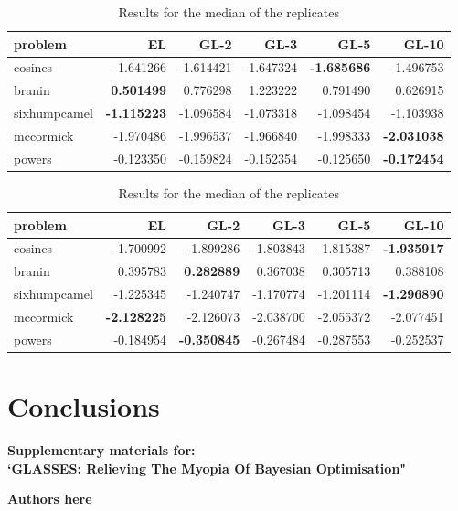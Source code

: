 \documentclass[twoside]{article}
\begin{document}
\begin{table*}
\begin{tabular}{lrrrrr}
\toprule
      problem &        EL &      GL-2 &      GL-3 &      GL-5 &     GL-10 \\
\midrule
      cosines & -1.641266 & -1.614421 & -1.647324 & \textbf{-1.685686} & -1.496753 \\
       branin &  \textbf{0.501499} &  0.776298 &  1.223222 &  0.791490 &  0.626915 \\
 sixhumpcamel & \textbf{-1.115223} & -1.096584 & -1.073318 & -1.098454 & -1.103938 \\
    mccormick & -1.970486 & -1.996537 & -1.966840 & -1.998333 & \textbf{-2.031038} \\
       powers & -0.123350 & -0.159824 & -0.152354 & -0.125650 & \textbf{-0.172454} \\
\bottomrule
\end{tabular}\caption{Results for the median of the replicates}
\end{table*}

\begin{table*}
\begin{tabular}{lrrrrr}
\toprule
      problem &        EL &      GL-2 &      GL-3 &      GL-5 &     GL-10 \\
\midrule
      cosines & -1.700992 & -1.899286 & -1.803843 & -1.815387 & \textbf{-1.935917} \\
       branin &  0.395783 &  \textbf{0.282889} &  0.367038 &  0.305713 &  0.388108 \\
 sixhumpcamel & -1.225345 & -1.240747 & -1.170774 & -1.201114 & \textbf{-1.296890} \\
    mccormick & \textbf{-2.128225} & -2.126073 & -2.038700 & -2.055372 & -2.077451 \\
       powers & -0.184954 & \textbf{-0.350845} & -0.267484 & -0.287553 & -0.252537 \\
\bottomrule
\end{tabular}\caption{Results for the median of the replicates}
\end{table*}

\section{Conclusions}




\newpage
\clearpage
\setcounter{section}{0}
\setcounter{equation}{0}
\renewcommand{\thesection}{S\arabic{section}}
\renewcommand{\theequation}{S.\arabic{equation}}
\onecolumn
\begin{center}
{\Large  \textbf{Supplementary materials for:\\
`GLASSES: Relieving The Myopia Of Bayesian Optimisation"}}
\end{center}
\begin{center}
\textbf{Authors here}
\end{center}
\end{document}
